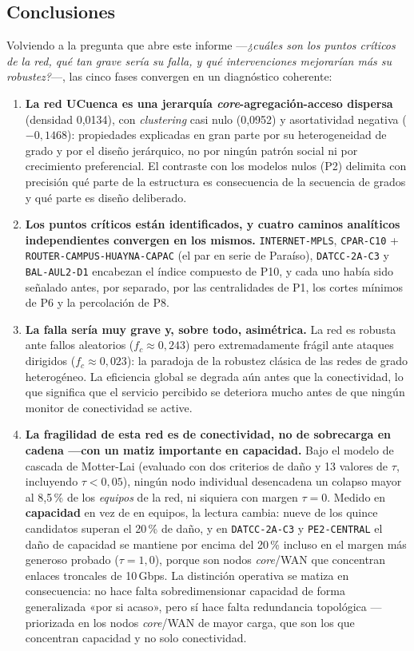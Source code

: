 \documentclass[10pt,a4paper]{extarticle}
\newcommand{\code}[1]{\texttt{\small #1}}
\begin{document}
\subsection{Conclusiones}

Volviendo a la pregunta que abre este informe ---\textit{¿cuáles son los puntos críticos de
la red, qué tan grave sería su falla, y qué intervenciones mejorarían más su robustez?}---,
las cinco fases convergen en un diagnóstico coherente:

\begin{enumerate}[leftmargin=*,itemsep=2mm]
\item \textbf{La red UCuenca es una jerarquía \textit{core}-agregación-acceso dispersa}
(densidad 0,0134), con \textit{clustering} casi nulo (0,0952) y asortatividad negativa
($-0{,}1468$): propiedades explicadas en gran parte por su heterogeneidad de grado y por el
diseño jerárquico, no por ningún patrón social ni por crecimiento preferencial. El contraste
con los modelos nulos (P2) delimita con precisión qué parte de la estructura es consecuencia
de la secuencia de grados y qué parte es diseño deliberado.

\item \textbf{Los puntos críticos están identificados, y cuatro caminos analíticos
independientes convergen en los mismos.} \code{INTERNET-MPLS}, \code{CPAR-C10} +
\code{ROUTER-CAMPUS-HUAYNA-CAPAC} (el par en serie de Paraíso), \code{DATCC-2A-C3} y
\code{BAL-AUL2-D1} encabezan el índice compuesto de P10, y cada uno había sido señalado
antes, por separado, por las centralidades de P1, los cortes mínimos de P6 y la percolación
de P8.

\item \textbf{La falla sería muy grave y, sobre todo, asimétrica.} La red es robusta ante
fallos aleatorios ($f_c \approx 0{,}243$) pero extremadamente frágil ante ataques dirigidos
($f_c \approx 0{,}023$): la paradoja de la robustez clásica de las redes de grado
heterogéneo. La eficiencia global se degrada aún antes que la conectividad, lo que significa
que el servicio percibido se deteriora mucho antes de que ningún monitor de conectividad se
active.

\item \textbf{La fragilidad de esta red es de conectividad, no de sobrecarga en cadena
---con un matiz importante en capacidad.} Bajo el modelo de cascada de Motter-Lai (evaluado
con dos criterios de daño y 13 valores de $\tau$, incluyendo $\tau<0{,}05$), ningún nodo
individual desencadena un colapso mayor al 8,5\,\% de los \textit{equipos} de la red, ni
siquiera con margen $\tau = 0$. Medido en \textbf{capacidad} en vez de en equipos, la
lectura cambia: nueve de los quince candidatos superan el 20\,\% de daño, y en \code{DATCC-2A-C3}
y \code{PE2-CENTRAL} el daño de capacidad se mantiene por encima del 20\,\% incluso en el
margen más generoso probado ($\tau=1{,}0$), porque son nodos \textit{core}/WAN que
concentran enlaces troncales de 10\,Gbps. La distinción operativa se matiza en consecuencia:
no hace falta sobredimensionar capacidad de forma generalizada «por si acaso», pero sí hace
falta redundancia topológica ---priorizada en los nodos \textit{core}/WAN de mayor carga, que
son los que concentran capacidad y no solo conectividad.


\end{enumerate}
\end{document}
